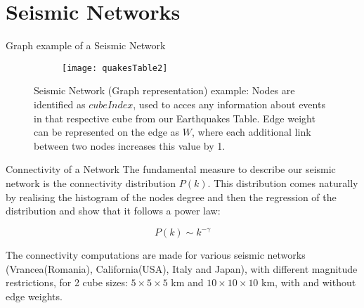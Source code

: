 \section{Seismic Networks}


\begin{frame}{Graph example of a Seismic Network}

\begin{figure}[h]
\begin{subfigure}[b]{0.4\linewidth}
\centering
{}
\end{subfigure}
\begin{subfigure}[b]{0.4\linewidth}
  \texttt{[image: quakesTable2]}
  \label{fig:qTab2}
\end{subfigure}%

\caption{Seismic Network (Graph representation) example: Nodes are identified as $cubeIndex$, used to acces any information about events in that respective cube from our Earthquakes Table. Edge weight can be represented on the edge as $W$, where each additional link between two nodes increases this value by 1.}
\end{figure}

\end{frame}


\begin{frame}{Connectivity of a Network}
The fundamental measure to describe our seismic network is the connectivity distribution $P(k)$. This distribution comes naturally by realising the histogram of the nodes degree and then the regression of the distribution and show that it follows a power law:

\begin{equation}
P(k) \sim k^{-\gamma}
\end{equation}

The connectivity computations are made for various seismic networks (Vrancea(Romania), California(USA), Italy and Japan), with different magnitude restrictions, for 2 cube sizes: $5\times5\times5$ km and $10\times10\times10$ km, with and without edge weights.
\end{frame}



